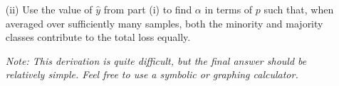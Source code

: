 \documentclass[11pt]{article}
\begin{document}
\begin{subparts}
\begin{enumerate}
            
            \item[(ii)] Use the value of $\hat{y}$ from part (i) to find $\alpha$ in terms of $p$ such that, when averaged over sufficiently many samples, both the minority and majority classes contribute to the total loss equally.
            
            \emph{Note: This derivation is quite difficult, but the final answer should be relatively simple. Feel free to use a symbolic or graphing calculator.}
            

\end{enumerate}
\end{subparts}
\end{document}

